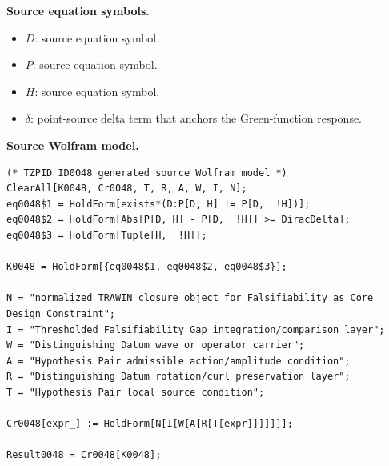 \begin{minipage}[t]{0.49\linewidth}
\begingroup
\small
\raggedright
\textbf{Source equation symbols.}\par
\begin{itemize}[leftmargin=1.35em,itemsep=1pt,topsep=1pt,parsep=0pt]
    \item $D$: source equation symbol.
    \item $P$: source equation symbol.
    \item $H$: source equation symbol.
    \item $\delta$: point-source delta term that anchors the Green-function response.
\end{itemize}
\endgroup
\end{minipage}\hfill
\begin{minipage}[t]{0.47\linewidth}
\begingroup
\scriptsize
\raggedright
\textbf{Source Wolfram model.}\par
\begin{Verbatim}[fontsize=\tiny,breaklines=true,breakanywhere=true]
(* TZPID ID0048 generated source Wolfram model *)
ClearAll[K0048, Cr0048, T, R, A, W, I, N];
eq0048$1 = HoldForm[exists*(D:P[D, H] != P[D,  !H])];
eq0048$2 = HoldForm[Abs[P[D, H] - P[D,  !H]] >= DiracDelta];
eq0048$3 = HoldForm[Tuple[H,  !H]];

K0048 = HoldForm[{eq0048$1, eq0048$2, eq0048$3}];

N = "normalized TRAWIN closure object for Falsifiability as Core Design Constraint";
I = "Thresholded Falsifiability Gap integration/comparison layer";
W = "Distinguishing Datum wave or operator carrier";
A = "Hypothesis Pair admissible action/amplitude condition";
R = "Distinguishing Datum rotation/curl preservation layer";
T = "Hypothesis Pair local source condition";

Cr0048[expr_] := HoldForm[N[I[W[A[R[T[expr]]]]]]];

Result0048 = Cr0048[K0048];
\end{Verbatim}
\endgroup
\end{minipage}

